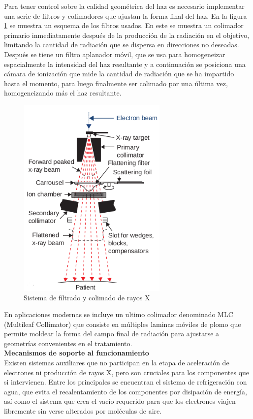 Para tener control sobre la calidad geométrica del haz es necesario implementar una serie de filtros y colimadores que ajustan la forma final del haz. En la figura \ref{fig:filtrosRayosX} se muestra un esquema de los filtros usados. En este se muestra un colimador primario inmediatamente después de la producción de la radiación en el objetivo, limitando la cantidad de radiación que se dispersa en direcciones no deseadas. Después se tiene un filtro aplanador móvil, que se usa para homogeneizar espacialmente la intensidad del haz resultante y a continuación se posiciona una cámara de ionización que mide la cantidad de radiación que se ha impartido hasta el momento, para luego finalmente ser colimado por una última vez, homogeneizando más el haz resultante.\\
\begin{figure}[H]
	\centering
	\includegraphics[width=0.7\linewidth, height=10cm]{images/filtros.png}
	\caption{Sistema de filtrado y colimado de rayos X\cite{khan2014the}}
	\label{fig:filtrosRayosX}
\end{figure}
En aplicaciones modernas se incluye un ultimo colimador denominado MLC (Multileaf Collimator) que consiste en múltiples laminas móviles de plomo que permite moldear la forma del campo final de radiación para ajustarse a geometrías convenientes en el tratamiento.\\


\textbf{Mecanismos de soporte al funcionamiento}\\

Existen sistemas auxiliares que no participan en la etapa de aceleración de electrones ni producción de rayos X, pero son cruciales para los componentes que si intervienen. Entre los principales se encuentran el sistema de refrigeración con agua, que evita el recalentamiento de los componentes por disipación de energía, así como el sistema que crea el vacío requerido para que los electrones viajen libremente sin verse alterados por moléculas de aire.\\

